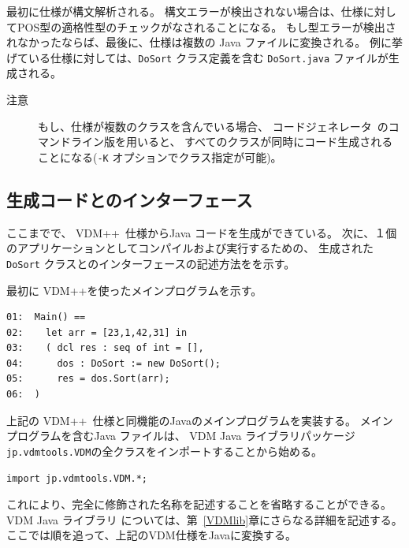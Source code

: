 \documentclass[\pformat,11pt]{jarticle}
\newcommand{\Tcg}{コードジェネレータ}
\newcommand{\VDM}{VDM++}
\newcommand{\JL}{VDM Java ライブラリ}
\begin{document}
最初に仕様が構文解析される。
構文エラーが検出されない場合は、仕様に対してPOS型の適格性型のチェックがなされることになる。
もし型エラーが検出されなかったならば、最後に、仕様は複数の Java ファイルに変換される。 
例に挙げている仕様に対しては、{\tt DoSort} クラス定義を含む {\tt DoSort.java} ファイルが生成される。

\begin{description}
  \item[注意] もし、仕様が複数のクラスを含んでいる場合、 \Tcg\ のコマンドライン版を用いると、
              すべてのクラスが同時にコード生成されることになる({\tt -K} オプションでクラス指定が可能)。
\end{description}


\subsection{生成コードとのインターフェース}\label{interfacinggettingstarted}

ここまでで、 \VDM\ 仕様からJava コードを生成ができている。
次に、１個のアプリケーションとしてコンパイルおよび実行するための、
生成された {\tt DoSort} クラスとのインターフェースの記述方法をを示す。

最初に \VDM{}を使ったメインプログラムを示す。

\begin{screen}
\begin{verbatim}
01:  Main() ==
02:    let arr = [23,1,42,31] in  
03:    ( dcl res : seq of int = [],
04:      dos : DoSort := new DoSort();
05:      res = dos.Sort(arr);
06:  )
\end{verbatim}
\end{screen}

上記の \VDM\ 仕様と同機能のJavaのメインプログラムを実装する。
メインプログラムを含むJava ファイルは、
\JL{}パッケージ{\tt jp.vdmtools.VDM}の全クラスをインポートすることから始める。

\begin{screen}
\begin{verbatim}
import jp.vdmtools.VDM.*;
\end{verbatim}
\end{screen}

これにより、完全に修飾された名称を記述することを省略することができる。
\JL{} については、第~\ref{VDMlib}章にさらなる詳細を記述する。
ここでは順を追って、上記のVDM仕様をJavaに変換する。
\end{document}
